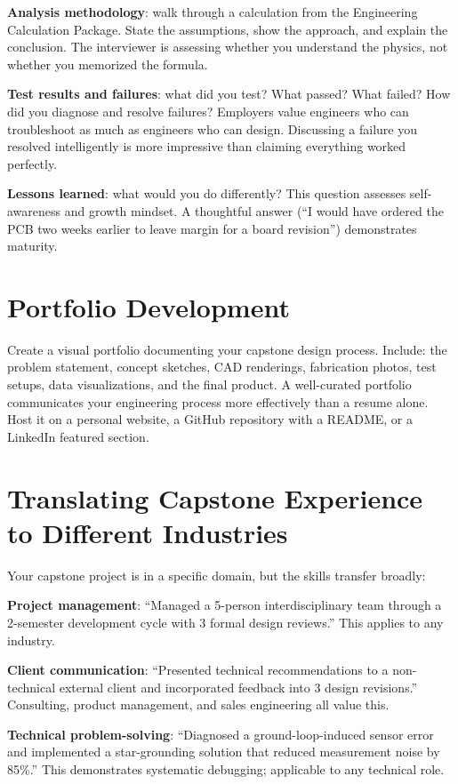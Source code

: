 \textbf{Analysis methodology}: walk through a calculation from the Engineering Calculation Package. State the assumptions, show the approach, and explain the conclusion. The interviewer is assessing whether you understand the physics, not whether you memorized the formula.

\textbf{Test results and failures}: what did you test? What passed? What failed? How did you diagnose and resolve failures? Employers value engineers who can troubleshoot as much as engineers who can design. Discussing a failure you resolved intelligently is more impressive than claiming everything worked perfectly.

\textbf{Lessons learned}: what would you do differently? This question assesses self-awareness and growth mindset. A thoughtful answer (``I would have ordered the PCB two weeks earlier to leave margin for a board revision'') demonstrates maturity.

\section{Portfolio Development}
Create a visual portfolio documenting your capstone design process. Include: the problem statement, concept sketches, CAD renderings, fabrication photos, test setups, data visualizations, and the final product. A well-curated portfolio communicates your engineering process more effectively than a resume alone. Host it on a personal website, a GitHub repository with a README, or a LinkedIn featured section.


\section{Translating Capstone Experience to Different Industries}
Your capstone project is in a specific domain, but the skills transfer broadly:

\textbf{Project management}: ``Managed a 5-person interdisciplinary team through a 2-semester development cycle with 3 formal design reviews.'' This applies to any industry.

\textbf{Client communication}: ``Presented technical recommendations to a non-technical external client and incorporated feedback into 3 design revisions.'' Consulting, product management, and sales engineering all value this.

\textbf{Technical problem-solving}: ``Diagnosed a ground-loop-induced sensor error and implemented a star-grounding solution that reduced measurement noise by 85\%.'' This demonstrates systematic debugging; applicable to any technical role.

